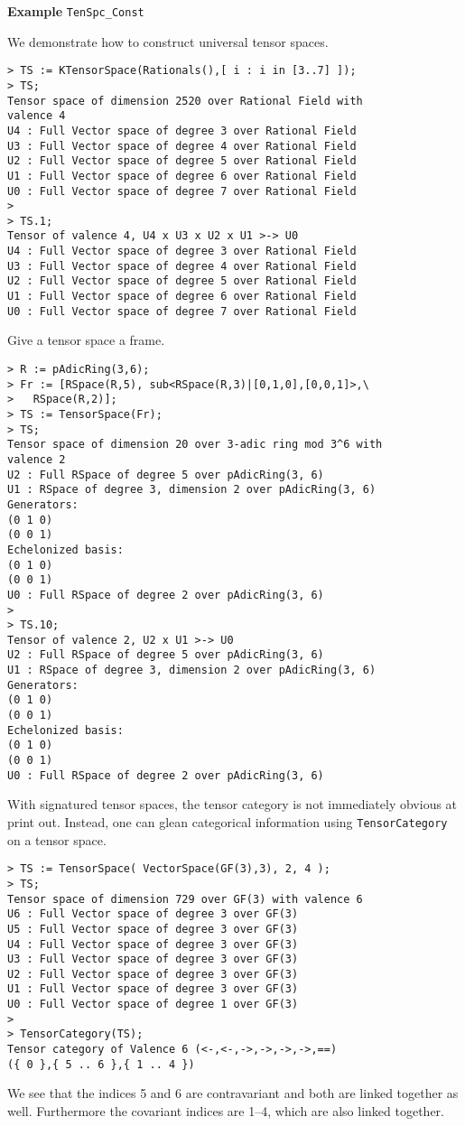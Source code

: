 \begin{framed}{\bf Example} {\tt TenSpc\_Const}\\
{\small We demonstrate how to construct universal tensor spaces.
\begin{lstlisting}[frame=single,basicstyle=\ttfamily\color{black!30!
teal},backgroundcolor=\color{white!70!gray}]
> TS := KTensorSpace(Rationals(),[ i : i in [3..7] ]);
> TS;
Tensor space of dimension 2520 over Rational Field with 
valence 4
U4 : Full Vector space of degree 3 over Rational Field
U3 : Full Vector space of degree 4 over Rational Field
U2 : Full Vector space of degree 5 over Rational Field
U1 : Full Vector space of degree 6 over Rational Field
U0 : Full Vector space of degree 7 over Rational Field
> 
> TS.1;
Tensor of valence 4, U4 x U3 x U2 x U1 >-> U0
U4 : Full Vector space of degree 3 over Rational Field
U3 : Full Vector space of degree 4 over Rational Field
U2 : Full Vector space of degree 5 over Rational Field
U1 : Full Vector space of degree 6 over Rational Field
U0 : Full Vector space of degree 7 over Rational Field
\end{lstlisting} 
Give a tensor space a frame.
\begin{lstlisting}[frame=single,basicstyle=\ttfamily\color{black!30!
teal},backgroundcolor=\color{white!70!gray}]
> R := pAdicRing(3,6);
> Fr := [RSpace(R,5), sub<RSpace(R,3)|[0,1,0],[0,0,1]>,\
>   RSpace(R,2)];
> TS := TensorSpace(Fr);
> TS;
Tensor space of dimension 20 over 3-adic ring mod 3^6 with 
valence 2
U2 : Full RSpace of degree 5 over pAdicRing(3, 6)
U1 : RSpace of degree 3, dimension 2 over pAdicRing(3, 6)
Generators:
(0 1 0)
(0 0 1)
Echelonized basis:
(0 1 0)
(0 0 1)
U0 : Full RSpace of degree 2 over pAdicRing(3, 6)
> 
> TS.10;
Tensor of valence 2, U2 x U1 >-> U0
U2 : Full RSpace of degree 5 over pAdicRing(3, 6)
U1 : RSpace of degree 3, dimension 2 over pAdicRing(3, 6)
Generators:
(0 1 0)
(0 0 1)
Echelonized basis:
(0 1 0)
(0 0 1)
U0 : Full RSpace of degree 2 over pAdicRing(3, 6)
\end{lstlisting}
With signatured tensor spaces, the tensor category is not immediately obvious at print out. 
Instead, one can glean categorical information using {\tt TensorCategory} on a tensor space.
\begin{lstlisting}[frame=single,basicstyle=\ttfamily\color{black!30!
teal},backgroundcolor=\color{white!70!gray}]
> TS := TensorSpace( VectorSpace(GF(3),3), 2, 4 );
> TS;
Tensor space of dimension 729 over GF(3) with valence 6
U6 : Full Vector space of degree 3 over GF(3)
U5 : Full Vector space of degree 3 over GF(3)
U4 : Full Vector space of degree 3 over GF(3)
U3 : Full Vector space of degree 3 over GF(3)
U2 : Full Vector space of degree 3 over GF(3)
U1 : Full Vector space of degree 3 over GF(3)
U0 : Full Vector space of degree 1 over GF(3)
> 
> TensorCategory(TS);
Tensor category of Valence 6 (<-,<-,->,->,->,->,==)
({ 0 },{ 5 .. 6 },{ 1 .. 4 })
\end{lstlisting}
We see that the indices 5 and 6 are contravariant and both are linked together as well. Furthermore the covariant indices are 1--4, which are also linked together.
}
\end{framed}

